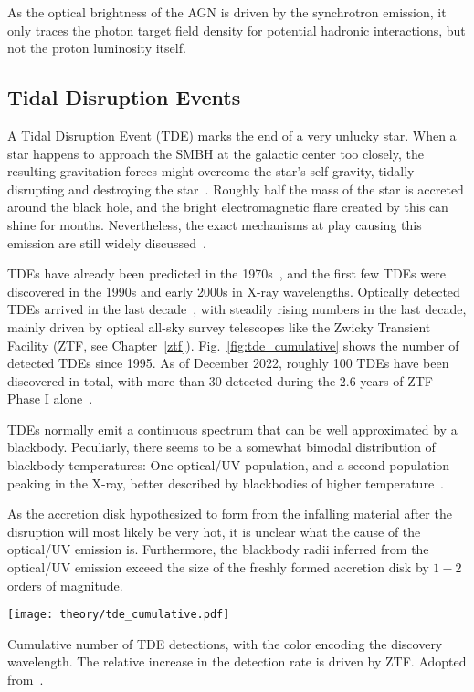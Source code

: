 As the optical brightness of the AGN is driven by the synchrotron emission, it only traces the photon target field density for potential hadronic interactions, but not the proton luminosity itself.

\subsection{Tidal Disruption Events}

A Tidal Disruption Event (TDE) marks the end of a very unlucky star. When a star happens to approach the SMBH at the galactic center too closely, the resulting gravitation forces might overcome the star's self-gravity, tidally disrupting and destroying the star~. Roughly half the mass of the star is accreted around the black hole, and the bright electromagnetic flare created by this can shine for months. Nevertheless, the exact mechanisms at play causing this emission are still widely discussed~.

TDEs have already been predicted in the 1970s~, and the first few TDEs were discovered in the 1990s and early 2000s in X-ray wavelengths. Optically detected TDEs arrived in the last decade~, with steadily rising numbers in the last decade, mainly driven by optical all-sky survey telescopes like the Zwicky Transient Facility (ZTF, see Chapter~\ref{ztf}). Fig.~\ref{fig:tde_cumulative} shows the number of detected TDEs since 1995. As of December 2022, roughly 100 TDEs have been discovered in total, with more than 30 detected during the 2.6 years of ZTF Phase I alone~.

TDEs normally emit a continuous spectrum that can be well approximated by a blackbody. Peculiarly, there seems to be a somewhat bimodal distribution of blackbody temperatures: One optical/UV population, and a second population peaking in the X-ray, better described by blackbodies of higher temperature~\cite{Gezari2021}.

As the accretion disk hypothesized  to form from the infalling material after the disruption will most likely be very hot, it is unclear what the cause of the optical/UV emission is. Furthermore, the blackbody radii inferred from the optical/UV emission exceed the size of the freshly formed accretion disk by $1-2$ orders of magnitude.

\begin{marginfigure}
    \texttt{[image: theory/tde\_cumulative.pdf]}
    \caption[TDE detections]{Cumulative number of TDE detections, with the color encoding the discovery wavelength. The relative increase in the detection rate is driven by ZTF\@. Adopted from~\cite{Gezari2021}.}
\end{marginfigure}

